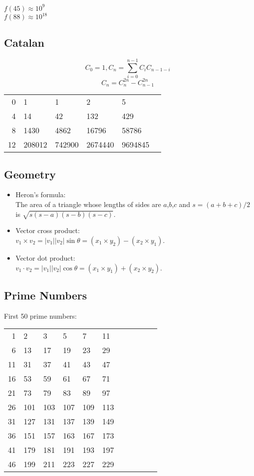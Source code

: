 \documentclass[twocolumn]{article}
\begin{document}
$f(45) \approx 10^9$\\
$f(88) \approx 10^{18}$

\subsection{Catalan}

$$C_0=1, C_n=\sum_{i=0}^{n-1} C_i C_{n-1-i}$$
$$C_n=C_n^{2n}-C_{n-1}^{2n}$$

\begin{center}
    \begin{tabular}{r|lllll}
        0 & 1 & 1 & 2 & 5 \\
        4 & 14 & 42 & 132 & 429 \\
        8 & 1430 & 4862 & 16796 & 58786 \\
        12 & 208012 & 742900 & 2674440 & 9694845
    \end{tabular}
\end{center}

\subsection{Geometry}

\begin{itemize}
    \item Heron's formula:\\ The area of a triangle whose lengths of sides are $a$,$b$,$c$ and $s = (a + b + c) / 2$ is $\sqrt{s(s-a)(s-b)(s-c)}$.
    \item Vector cross product:\\ $v_1 \times v_2 = |v_1||v_2| \sin \theta = (x_1 \times y_2) - (x_2 \times y_1)$.
    \item Vector dot product:\\ $v_1 \cdot v_2 = |v_1||v_2| \cos \theta = (x_1 \times y_1) + (x_2 \times y_2)$.
\end{itemize}

\subsection{Prime Numbers}

First 50 prime numbers:\\
\begin{center}
    \begin{tabular}{r|llllllllll}
        1 & 2 & 3 & 5 & 7 & 11 \\
        6 & 13 & 17 & 19 & 23 & 29 \\
        11 & 31 & 37 & 41 & 43 & 47 \\
        16 & 53 & 59 & 61 & 67 & 71 \\
        21 & 73 & 79 & 83 & 89 & 97 \\
        26 & 101 & 103 & 107 & 109 & 113 \\
        31 & 127 & 131 & 137 & 139 & 149 \\
        36 & 151 & 157 & 163 & 167 & 173 \\
        41 & 179 & 181 & 191 & 193 & 197 \\
        46 & 199 & 211 & 223 & 227 & 229
    \end{tabular}
\end{center}
\end{document}
